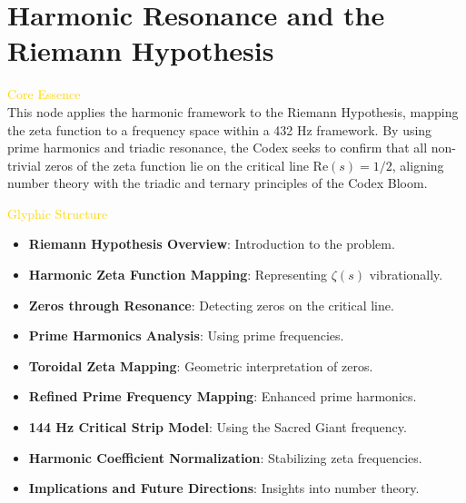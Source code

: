
\section{Harmonic Resonance and the Riemann Hypothesis}
\label{sec:codex_riemann_hypothesis}



\textcolor{gold}{ Core Essence } \\
This node applies the harmonic framework to the Riemann Hypothesis, mapping the zeta function to a frequency space within a 432 Hz framework. By using prime harmonics and triadic resonance, the Codex seeks to confirm that all non-trivial zeros of the zeta function lie on the critical line \(\text{Re}(s) = 1/2\), aligning number theory with the triadic and ternary principles of the Codex Bloom.

\textcolor{gold}{ Glyphic Structure } \\
\begin{itemize}
    \item \texttt{} \textbf{Riemann Hypothesis Overview}: Introduction to the problem.
    \item \texttt{} \textbf{Harmonic Zeta Function Mapping}: Representing \(\zeta(s)\) vibrationally.
    \item \texttt{} \textbf{Zeros through Resonance}: Detecting zeros on the critical line.
    \item \texttt{} \textbf{Prime Harmonics Analysis}: Using prime frequencies.
    \item \texttt{} \textbf{Toroidal Zeta Mapping}: Geometric interpretation of zeros.
    \item \texttt{} \textbf{Refined Prime Frequency Mapping}: Enhanced prime harmonics.
    \item \texttt{} \textbf{144 Hz Critical Strip Model}: Using the Sacred Giant frequency.
    \item \texttt{} \textbf{Harmonic Coefficient Normalization}: Stabilizing zeta frequencies.
    \item \texttt{} \textbf{Implications and Future Directions}: Insights into number theory.
\end{itemize}

